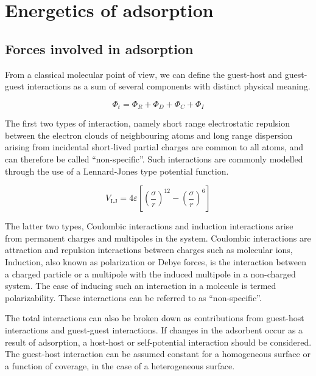 
\section{Energetics of adsorption}

\subsection{Forces involved in adsorption}

From a classical molecular point of view, we can define the 
guest-host and guest-guest interactions as a sum of several
components with distinct physical meaning.

\begin{equation}\label{calo:eqn:interactions}
  \Phi_t = \Phi_{R} + \Phi_{D} + \Phi_{C} + \Phi_{I}
\end{equation}

The first two types of interaction, namely short range 
electrostatic repulsion between the electron clouds of 
neighbouring atoms and long range dispersion arising from
incidental short-lived partial charges are common to all
atoms, and can therefore be called ``non-specific''. Such 
interactions are commonly modelled through the use of a 
Lennard-Jones type potential function.

\begin{equation}\label{calo:eqn:lennard-jones}
  V_\text{LJ} = 4\varepsilon \left[ \left(\frac{\sigma}{r}\right)^{12} - \left(\frac{\sigma}{r}\right)^6 \right]
\end{equation}

The latter two types, Coulombic interactions and induction 
interactions arise from permanent charges and multipoles in the 
system. Coulombic interactions are attraction and repulsion
interactions between charges such as molecular ions,
Induction, also known as polarization or Debye forces, is the interaction
between a charged particle or a multipole with the induced multipole
in a non-charged system. The ease of inducing such an interaction
in a molecule is termed polarizability. These interactions 
can be referred to as ``non-specific''.

The total interactions can also be broken down as contributions
from guest-host interactions and guest-guest interactions.
If changes in the adsorbent occur as a result of adsorption,
a host-host or self-potential interaction should be considered.
The guest-host interaction can be assumed constant for a homogeneous
surface or a function of coverage, in the case of a 
heterogeneous surface.

